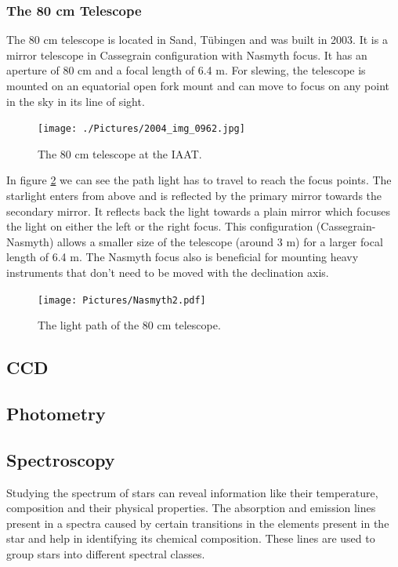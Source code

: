 \documentclass[12pt,a4paper]{article}
\begin{document}
  \subsubsection{The 80 cm Telescope}
  \label{sec:80tele}
    The 80 cm telescope is located in Sand, Tübingen and was built in 2003. It is a mirror telescope in Cassegrain configuration with Nasmyth focus. It has an aperture of 80 cm and 
    a focal length of 6.4 m. For slewing, the telescope is mounted on an equatorial open fork mount and can move to focus on any point in the sky in its line of sight.
    \begin{figure}[H]
      \centering
      \texttt{[image: ./Pictures/2004\_img\_0962.jpg]}
      \caption{The 80 cm telescope at the IAAT.}
      \label{fig:80cm}
    \end{figure}
    In figure \ref{fig:80cm_lp} we can see the path light has to travel to reach the focus points. The starlight enters from above and is reflected by the primary mirror towards the 
    secondary mirror. It reflects back the light towards a plain mirror which focuses the light on either the left or the right focus. This configuration (Cassegrain-Nasmyth) allows a smaller size of the telescope
    (around 3 m) for a larger focal length of 6.4 m. The Nasmyth focus also is beneficial for mounting heavy instruments that don't need to be moved with the declination axis. 
    \begin{figure}[H]
      \centering
      \texttt{[image: Pictures/Nasmyth2.pdf]}
      \caption{The light path of the 80 cm telescope.}
      \label{fig:80cm_lp}
    \end{figure}

  \subsection{CCD}
  \subsection{Photometry}
  \subsection{Spectroscopy}
    Studying the spectrum of stars can reveal information like their temperature, composition and their physical properties. The absorption and emission lines present 
    in a spectra caused by certain transitions in the elements present in the star and help in identifying its chemical composition. These lines are used to group
    stars into different spectral classes. \\
\end{document}
